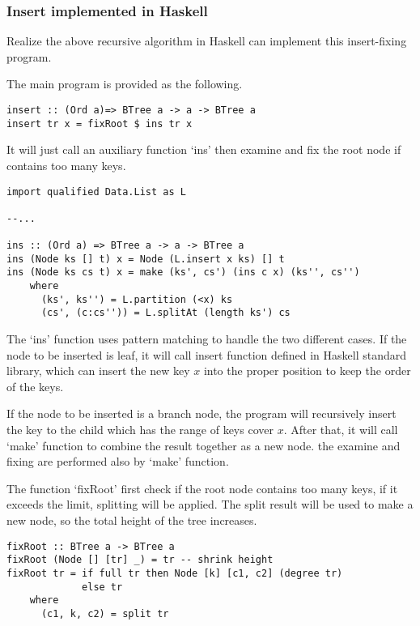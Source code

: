 \documentclass{article}
\begin{document}
\subsubsection*{Insert implemented in Haskell}
Realize the above recursive algorithm in Haskell can implement this 
insert-fixing program.

The main program is provided as the following.

\lstset{language=Haskell}
\begin{lstlisting}
insert :: (Ord a)=> BTree a -> a -> BTree a
insert tr x = fixRoot $ ins tr x
\end{lstlisting} %

It will just call an auxiliary function `ins' then examine and 
fix the root node if contains too many keys.

\begin{lstlisting}
import qualified Data.List as L

--...

ins :: (Ord a) => BTree a -> a -> BTree a
ins (Node ks [] t) x = Node (L.insert x ks) [] t
ins (Node ks cs t) x = make (ks', cs') (ins c x) (ks'', cs'') 
    where
      (ks', ks'') = L.partition (<x) ks
      (cs', (c:cs'')) = L.splitAt (length ks') cs
\end{lstlisting}

The `ins' function uses pattern matching to handle the two different
cases. If the node to be inserted is leaf, it will call insert
function defined in Haskell standard library, which can insert the
new key $x$ into the proper position to keep the order of the keys.

If the node to be inserted is a branch node, the program will recursively
insert the key to the child which has the range of keys cover $x$.
After that, it will call `make' function to combine the result
together as a new node. the examine and fixing are performed also
by `make' function.

The function `fixRoot' first check if the root node contains too
many keys, if it exceeds the limit, splitting will be applied.
The split result will be used to make a new node, so the total
height of the tree increases.

\begin{lstlisting}
fixRoot :: BTree a -> BTree a
fixRoot (Node [] [tr] _) = tr -- shrink height
fixRoot tr = if full tr then Node [k] [c1, c2] (degree tr) 
             else tr 
    where
      (c1, k, c2) = split tr
\end{lstlisting}
\end{document}
